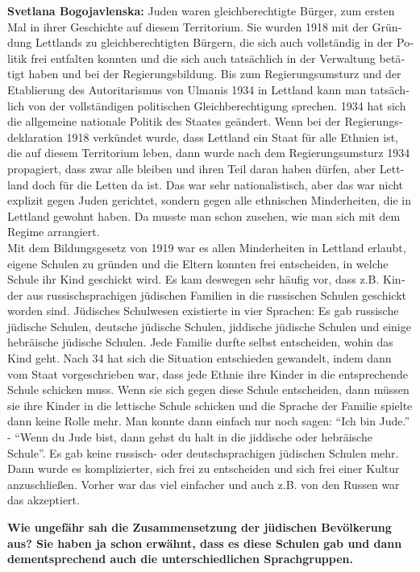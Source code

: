 \begin{otherlanguage}{ngerman}
\textbf{Svetlana Bogojavlenska:} Juden waren gleichberechtigte Bürger, zum ersten Mal in ihrer Geschichte auf diesem Territorium. Sie wurden 1918 mit der Gründung Lettlands zu gleichberechtigten Bürgern, die sich auch vollständig in der Politik frei entfalten konnten und die sich auch tatsächlich in der Verwaltung betätigt haben und bei der Regierungsbildung. Bis zum Regierungsumsturz und der Etablierung des Autoritarismus von Ulmanis 1934 in Lettland kann man tatsächlich von der vollständigen politischen Gleichberechtigung sprechen.
1934 hat sich die allgemeine nationale Politik des Staates geändert. Wenn bei der Regierungsdeklaration 1918 verkündet wurde, dass Lettland ein Staat für alle Ethnien ist, die auf diesem Territorium leben, dann wurde nach dem Regierungsumsturz 1934 propagiert, dass zwar alle bleiben und ihren Teil daran haben dürfen, aber Lettland doch für die Letten da ist. Das war sehr nationalistisch, aber das war nicht explizit gegen Juden gerichtet, sondern gegen alle ethnischen Minderheiten, die in Lettland gewohnt haben. Da musste man schon zusehen, wie man sich mit dem Regime arrangiert.\\
Mit dem Bildungsgesetz von 1919 war es allen Minderheiten in Lettland erlaubt, eigene Schulen zu gründen und die Eltern konnten frei entscheiden, in welche Schule ihr Kind geschickt wird. Es kam deswegen sehr häufig vor, dass z.B. Kinder aus russischsprachigen jüdischen Familien in die russischen Schulen geschickt worden sind. Jüdisches Schulwesen existierte in vier Sprachen: Es gab russische jüdische Schulen, deutsche jüdische Schulen, jiddische jüdische Schulen und einige hebräische jüdische Schulen. Jede Familie durfte selbst entscheiden, wohin das Kind geht. Nach 34 hat sich die Situation entschieden gewandelt, indem dann vom Staat vorgeschrieben war, dass jede Ethnie ihre Kinder in die entsprechende Schule schicken muss. Wenn sie sich gegen diese Schule entscheiden, dann müssen sie ihre Kinder in die lettische Schule schicken und die Sprache der Familie spielte dann keine Rolle mehr. Man konnte dann einfach nur noch sagen: "`Ich bin Jude."' - "`Wenn du Jude bist, dann gehst du halt in die jiddische oder hebräische Schule"'. Es gab keine russisch- oder deutschsprachigen jüdischen Schulen mehr. Dann wurde es komplizierter, sich frei zu entscheiden und sich frei einer Kultur anzuschließen. Vorher war das viel einfacher und auch z.B. von den Russen war das akzeptiert.

\textbf{Wie ungefähr sah die Zusammensetzung der jüdischen Bevölkerung aus? Sie haben ja schon erwähnt, dass es diese Schulen gab und dann dementsprechend auch die unterschiedlichen Sprachgruppen.}


\end{otherlanguage}
